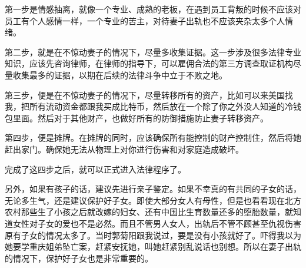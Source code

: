 第一步是情感抽离，就像一个专业、成熟的老板，在遇到员工背叛的时候不应该对员工有个人感情一样，一个专业的苦主，对待妻子出轨也不应该夹杂太多个人情绪。

第二步，就是在不惊动妻子的情况下，尽量多收集证据。这一步涉及很多法律专业知识，应该先咨询律师，在律师的指导下，可以雇佣合法的第三方调查取证机构尽量收集最多的证据，以期在后续的法律斗争中立于不败之地。

第三步，便是在不惊动妻子的情况下，尽量转移所有的资产，比如可以来美国找我，把所有流动资金都跟我买成比特币，然后放在一个除了你之外没人知道的冷钱包里面。然后对于其他财产，也做好所有的防御措施防止妻子转移资产。

第四步，便是摊牌。在摊牌的同时，应该确保所有能控制的财产控制住，然后将她赶出家门。确保她无法从物理上对你进行伤害和对家庭造成破坏。

完成了这四步之后，就可以正式进入法律程序了。

另外，如果有孩子的话，建议先进行亲子鉴定。如果不幸真的有共同的子女的话，无论多生气，还是建议保护好子女。即使大部分女人有母性，但是也看看现在北方农村那些生了小孩之后就改嫁的妇女、还有中国比生育数量还多的堕胎数量，就知道女性对子女的爱也不是必然。而且不管男人女人，出轨后不管不顾甚至仇视伤害原有子女的情况太多了。当时郭菊阳跟我说过，要是没有小孩就好了。吓得我以为她要学重庆姐弟坠亡案，赶紧安抚她，叫她赶紧别乱说话也别想。所以在妻子出轨的情况下，保护好子女也是非常重要的。
